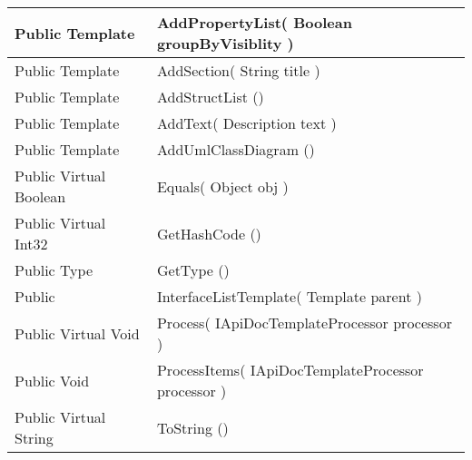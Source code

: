 \documentclass[11pt, oneside, a4paper]{book}
\begin{document}
\begin{center}
\begin{tabular}{| p{3cm} | p{12cm} | }
 Public  Template &  AddPropertyList(\hypertarget{SoftwareEngineeringTools.{}Documentation.{}InterfaceListTemplate.{}AddPropertyList\_Boolean}{} Boolean  groupByVisiblity  )\\
\hline
 Public  Template &  AddSection(\hypertarget{SoftwareEngineeringTools.{}Documentation.{}InterfaceListTemplate.{}AddSection\_String}{} String  title  )\\
\hline
 Public  Template &  AddStructList ()\hypertarget{SoftwareEngineeringTools.{}Documentation.{}InterfaceListTemplate.{}AddStructList}{}\\
\hline
 Public  Template &  AddText(\hypertarget{SoftwareEngineeringTools.{}Documentation.{}InterfaceListTemplate.{}AddText\_Description}{} Description  text  )\\
\hline
 Public  Template &  AddUmlClassDiagram ()\hypertarget{SoftwareEngineeringTools.{}Documentation.{}InterfaceListTemplate.{}AddUmlClassDiagram}{}\\
\hline
 Public  Virtual  Boolean &  Equals(\hypertarget{SoftwareEngineeringTools.{}Documentation.{}InterfaceListTemplate.{}Equals\_Object}{} Object  obj  )\\
\hline
 Public  Virtual  Int32 &  GetHashCode ()\hypertarget{SoftwareEngineeringTools.{}Documentation.{}InterfaceListTemplate.{}GetHashCode}{}\\
\hline
 Public  Type &  GetType ()\hypertarget{SoftwareEngineeringTools.{}Documentation.{}InterfaceListTemplate.{}GetType}{}\\
\hline
 Public  &  InterfaceListTemplate(\hypertarget{SoftwareEngineeringTools.{}Documentation.{}InterfaceListTemplate.{}InterfaceListTemplate\_Template}{} Template  parent  )\\
\hline
 Public  Virtual  Void &  Process(\hypertarget{SoftwareEngineeringTools.{}Documentation.{}InterfaceListTemplate.{}Process\_IApiDocTemplateProcessor}{} IApiDocTemplateProcessor  processor  )\\
\hline
 Public  Void &  ProcessItems(\hypertarget{SoftwareEngineeringTools.{}Documentation.{}InterfaceListTemplate.{}ProcessItems\_IApiDocTemplateProcessor}{} IApiDocTemplateProcessor  processor  )\\
\hline
 Public  Virtual  String &  ToString ()\hypertarget{SoftwareEngineeringTools.{}Documentation.{}InterfaceListTemplate.{}ToString}{}\\
\hline
\end{tabular}
\end{center}
 
\end{document}
